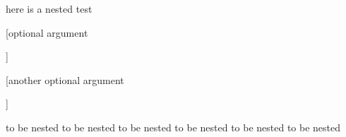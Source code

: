 here is a nested test
\begin{one}

	[optional argument

	]

	[another optional argument


	]




	to be nested to be nested
	to be nested to be nested
	to be nested to be nested
\end{one}
